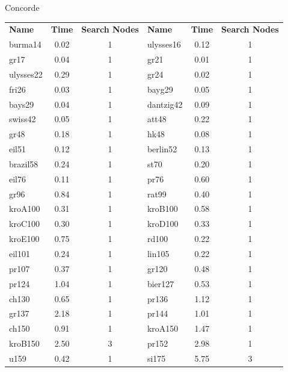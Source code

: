 \documentclass[handout]{beamer}
\begin{document}
  \begin{frame}[t]{Concorde}
    \begin{table}\scriptsize
    \begin{tabularx}{\textwidth}{l c c | l c c}
      \textbf{Name} & \textbf{Time} & \textbf{Search Nodes} & \textbf{Name} & \textbf{Time} & \textbf{Search Nodes} \\
  burma14&0.02&1& ulysses16&0.12&1 \\
  gr17&0.04&1&  gr21&0.01&1 \\
  ulysses22&0.29&1& gr24&0.02&1 \\
  fri26&0.03&1& bayg29&0.05&1 \\
  bays29&0.04&1&  dantzig42&0.09&1 \\
  swiss42&0.05&1& att48&0.22&1 \\
  gr48&0.18&1&  hk48&0.08&1 \\
  eil51&0.12&1& berlin52&0.13&1 \\
  brazil58&0.24&1&  st70&0.20&1 \\
  eil76&0.11&1& pr76&0.60&1 \\
  gr96&0.84&1&  rat99&0.40&1 \\
  kroA100&0.31&1& kroB100&0.58&1 \\
  kroC100&0.30&1& kroD100&0.33&1 \\
  kroE100&0.75&1& rd100&0.22&1 \\
  eil101&0.24&1&  lin105&0.22&1 \\
  pr107&0.37&1& gr120&0.48&1 \\
  pr124&1.04&1& bier127&0.53&1 \\
  ch130&0.65&1& pr136&1.12&1 \\
  gr137&2.18&1& pr144&1.01&1 \\
  ch150&0.91&1& kroA150&1.47&1 \\
  kroB150&2.50&3& pr152&2.98&1 \\
  u159&0.42&1&  si175&5.75&3 \\
  \end{tabularx}
  \end{table}
  \end{frame}
\end{document}
